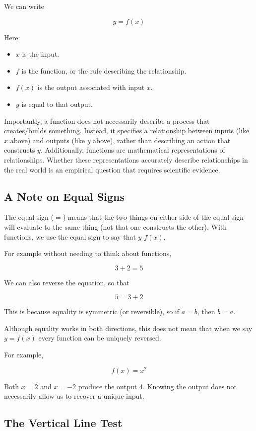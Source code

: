 \documentclass[12pt]{article}
\begin{document}
We can write

\[
y=f(x)
\]

Here:

\begin{itemize}
    \item $x$ is the input.
    \item $f$ is the function, or the rule describing the relationship.
    \item $f(x)$ is the output associated with input $x$.
    \item $y$ is equal to that output.
\end{itemize}

Importantly, a function does not necessarily describe a process that creates/builds something. Instead, it specifies a relationship between inputs (like $x$ above) and outputs (like $y$ above), rather than describing an action that constructs $y$. Additionally, functions are mathematical representations of relationships. Whether these representations accurately describe relationships in the real world is an empirical question that requires scientific evidence.

\subsection{A Note on Equal Signs}

The equal sign ($=$) means that the two things on either side of the equal sign will evaluate to the same thing (not that one constructs the other). With functions, we use the equal sign to say that $y$  $f(x)$.

For example without needing to think about functions,

\[
3+2=5
\]

We can also reverse the equation, so that

\[
5=3+2
\]

This is because equality is symmetric (or reversible), so if $a=b$, then $b=a$. 

Although equality works in both directions, this does not mean that when we say $y = f(x)$ every function can be uniquely reversed.

For example,

\[
f(x)=x^2
\]

Both $x=2$ and $x=-2$ produce the output 4. Knowing the output does not necessarily allow us to recover a unique input.

\subsection{The Vertical Line Test}
\end{document}
